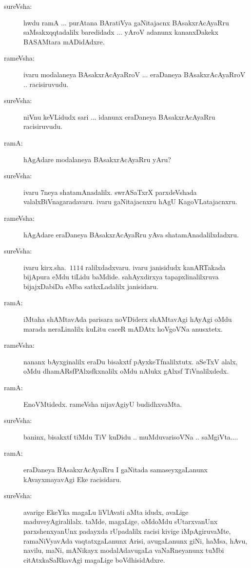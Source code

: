 \begin{description}
\item[sureVsha:] hwdu ramA ... purAtana BAratiVya gaNitajacnx BAsakxrAcAyaRru saMsakxqqtadalilx baredidadx ... yAroV adanunx kananxDakekx BASAMtara mADidAdxre.

\item[rameVsha:] ivaru modalaneya BAsakxrAcAyaRroV ... eraDaneya BAsakxrAcAyaRroV .. racisiruvudu.

\item[sureVsha:] niVnu keVLidudx sari ... idanunx eraDaneya BAsakxrAcAyaRru racisiruvudu.

\item[ramA:] hAgAdare modalaneya BAsakxrAcAyaRru yAru?

\item[sureVsha:] ivaru $7$neya shatamAnadalilx. swrASaTxrX parxdeVshada valalxBiVnagaradavaru. ivaru gaNitajacnxru hAgU KagoVLatajacnxru.

\item[rameVsha:] hAgAdare eraDaneya BAsakxrAcAyaRru yAva shatamAnadalilxdadxru.

\item[sureVsha:] ivaru kirx.sha.\ $1114$ ralilxdadxvaru. ivaru janisidudx kanARTakada bijApura eMdu tiLidu baMdide. sahAyxdirxya tapapxlinalilxruva bijajxDabiDa eMba sathxLadalilx janisidaru.

\item[ramA:] iMtaha shAMtavAda parisara noVDiderx shAMtavAgi hAyAgi oMdu marada neraLinalilx kuLitu caceR mADAtx hoVgoVNa anusxtetx.

\item[rameVsha:] nananx bAyxginalilx eraDu bisakxtf pAyxkeTfnalilxtutx. aSeTxV alalx, oMdu dhamARsfPAlxsfkxnalilx oMdu nAlukx gAlxsf TiVnalilxdedx.

\item[ramA:] EnoVMtidedx. rameVsha nijavAgiyU budidhxvaMta.

\item[sureVsha:] baninx, bisakxtf tiMdu TiV kuDidu .. muMduvarisoVNa .. saMgiVta....

\item[ramA:] eraDaneya BAsakxrAcAyaRru I gaNitada samaseyxgaLanunx kAvayxmayavAgi Eke racisidaru.

\item[sureVsha:] avarige EkeYka magaLu liVlAvati aMta idudx, avaLige maduveyAgiralilalx. taMde, magaLige, oMdoMdu sUtarxvanUnx parxshenxyanUnx padayxda rUpadalilx racisi kivige iMpAgiruvaMte, ramaNiVyavAda vaqtatxgaLanunx Arisi, avugaLanunx giNi, haMsa, hAvu, navilu, maNi, mANikayx modalAdavugaLa vaNaRneyanunx tuMbi citAtxkaSaRkavAgi magaLige boVdhisidAdxre.


\end{description}
